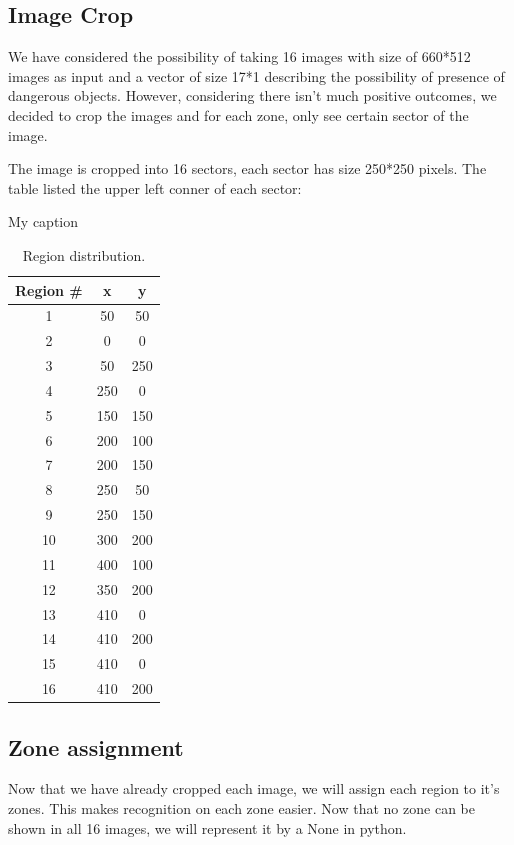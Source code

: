 \documentclass[conference,compsoc]{IEEEtran}
\begin{document}
\subsection{Image Crop}
We have considered the possibility of taking 16 images with size of 660*512 images as input and a vector of size 17*1 describing the possibility of presence of dangerous objects. However, considering there isn't much positive outcomes, we decided to crop the images and for each zone, only see certain sector of the image.

The image is cropped into 16 sectors, each sector has size 250*250 pixels. The table listed the upper left conner of each sector:
\begin{table}[!htb]
    \centering
    \caption{My caption}
    \label{my-label}
    \begin{tabular}{ccc}
        \hline
        Region \# & x   & y   \\ \hline
        1         & 50  & 50  \\ \hline
        2         & 0   & 0   \\ \hline
        3         & 50  & 250 \\ \hline
        4         & 250 & 0   \\ \hline
        5         & 150 & 150 \\ \hline
        6         & 200 & 100 \\ \hline
        7         & 200 & 150 \\ \hline
        8         & 250 & 50  \\ \hline
        9         & 250 & 150 \\ \hline
        10        & 300 & 200 \\ \hline
        11        & 400 & 100 \\ \hline
        12        & 350 & 200 \\ \hline
        13        & 410 & 0   \\ \hline
        14        & 410 & 200 \\ \hline
        15        & 410 & 0   \\ \hline
        16        & 410 & 200 \\ \hline
    \end{tabular}
    \caption{Region distribution.}
\end{table}
\subsection{Zone assignment}
Now that we have already cropped each image, we will assign each region to it's zones. This makes recognition on each zone easier. Now that no zone can be shown in all 16 images, we will represent it by a None in python.
\end{document}
